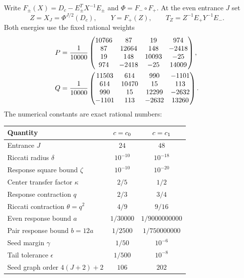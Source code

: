 Write $F_\pm(X)=D_c-E_\pm^TX^{-1}E_\pm$ and
$\Phi=F_-\circ F_+$. At the even entrance $J$ set
\[
 Z=X_J=\Phi^{J/2}(D_c),\qquad Y=F_+(Z),\qquad
 T_Z=Z^{-1}E_+Y^{-1}E_-.
\]
Both energies use the fixed rational weights
\begin{align}
 P&=\frac1{10000}\begin{pmatrix}
10766&87&19&974\\87&12664&148&-2418\\19&148&10093&-25\\974&-2418&-25&14009
\end{pmatrix},\notag\\
 Q&=\frac1{10000}\begin{pmatrix}
11503&614&990&-1101\\614&10470&15&113\\990&15&12299&-2632\\-1101&113&-2632&13260
\end{pmatrix}.
\label{eq:weights}
\end{align}
The numerical constants are exact rational numbers:
\begin{center}
\begin{tabular}{lcc}
\toprule
Quantity & $c=c_0$ & $c=c_1$\\
\midrule
Entrance $J$ & $24$ & $48$\\
Riccati radius $\delta$ & $10^{-10}$ & $10^{-18}$\\
Response square bound $\zeta$ & $10^{-10}$ & $10^{-20}$\\
Center transfer factor $\kappa$ & $2/5$ & $1/2$\\
Response contraction $q$ & $2/3$ & $3/4$\\
Riccati contraction $\theta=q^2$ & $4/9$ & $9/16$\\
Even response bound $a$ & $1/30000$ & $1/9000000000$\\
Pair response bound $b=12a$ & $1/2500$ & $1/750000000$\\
Seed margin $\gamma$ & $1/50$ & $10^{-6}$\\
Tail tolerance $\epsilon$ & $1/500$ & $10^{-8}$\\
Seed graph order $4(J+2)+2$ & $106$ & $202$\\
\bottomrule
\end{tabular}
\end{center}

